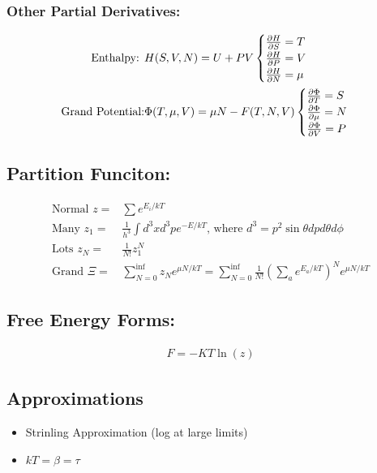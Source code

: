 \subsubsection*{Other Partial Derivatives:}

\begin{align}
    \text{Enthalpy: } & H(S, V, N) = U + PV 
        \begin{cases}
        \pdv{H}{S} = T \\
        \pdv{H}{P} = V \\
        \pdv{H}{N} = \mu \\
        \end{cases} \\  
    \text{Grand Potential:} & \Phi(T, \mu, V) = \mu N - F(T, N, V)
    \begin{cases}
    \pdv{\Phi}{T} = S \\
    \pdv{\Phi}{\mu} = N \\
    \pdv{\Phi}{V} = P \\
    \end{cases}
\end{align}
     

\subsection*{Partition Funciton:}

\begin{align}
    \text{Normal  } z =& \sum e^{E_i / kT} \\
    \text{Many } z_1 =& \frac{1}{h^3} \int d^3x d^3p e^{-E/ kT}\text{, where } d^3 = p^2\sin\theta dp d\theta d\phi \\
    \text{Lots } z_N =& \frac{1}{N!} z_1^N  \\
    \text{Grand } \Xi =& \sum_{N=0}^{\inf} z_N e^{\mu N / kT} = \sum_{N=0}^{\inf} \frac{1}{N!} (\sum_a e^{E_a / kT})^N e^{\mu N / kT}
\end{align}


\subsection*{Free Energy Forms:}
\begin{align}
    F = - KT \ln(z)
\end{align}

\subsection*{Approximations}

\begin{itemize}
    \item Strinling Approximation (log at large limits)
    \item $k T = \beta = \tau$
\end{itemize}